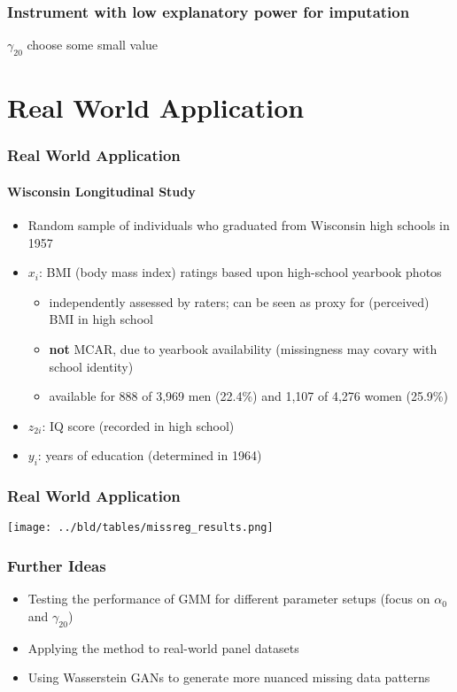 \documentclass[aspectratio=1610]{beamer}
\begin{document}
\begin{frame}
	\frametitle{Instrument with low explanatory power for imputation}
	$\gamma_{20}$ choose some small value
\end{frame}
\begin{frame}
    
\end{frame}


\section{Real World Application}

\begin{frame}
	\frametitle{Real World Application}
	\framesubtitle{Wisconsin Longitudinal Study}
	\begin{itemize}
		\item<1-> Random sample of individuals who graduated from Wisconsin high schools in 1957

		\item<2-> $x_i$: BMI (body mass index) ratings based upon high-school yearbook photos
		\begin{itemize}
			\item<2-> independently assessed by raters; can be seen as proxy for (perceived) BMI in high school
			\item<2-> \textbf{not} MCAR, due to yearbook availability (missingness may covary with school identity)
			\item<2-> available for 888 of 3,969 men (22.4\%) and 1,107 of 4,276 women (25.9\%)
		\end{itemize}

		\item<3-> $z_{2i}$: IQ score (recorded in high school)

		\item<4-> $y_i$: years of education (determined in 1964)
	\end{itemize}
\end{frame}

\begin{frame}
	\frametitle{Real World Application}
	\center
    \texttt{[image: ../bld/tables/missreg\_results.png]}
\end{frame}

\begin{frame}
	\frametitle{Further Ideas}
	\begin{itemize}
		\item Testing the performance of GMM for different parameter setups (focus on $\alpha_0$ and $\gamma_{20}$)
		\item Applying the method to real-world panel datasets
		\item Using Wasserstein GANs to generate more nuanced missing data patterns
	\end{itemize}
\end{frame}
\end{document}

